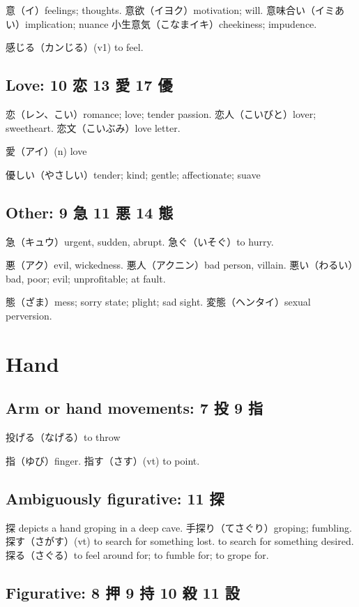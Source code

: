 意（イ）feelings; thoughts.
意欲（イヨク）motivation; will.
意味合い（イミあい）implication; nuance
小生意気（こなまイキ）cheekiness; impudence.

感じる（カンじる）(v1) to feel.

\subsection{Love: 10 恋 13 愛 17 優}

恋（レン、こい）romance; love; tender passion.
恋人（こいびと）lover; sweetheart.
恋文（こいぶみ）love letter.

愛（アイ）(n) love

優しい（やさしい）tender; kind; gentle; affectionate; suave

\subsection{Other: 9 急 11 悪 14 態}

急（キュウ）urgent, sudden, abrupt.
急ぐ（いそぐ）to hurry.

悪（アク）evil, wickedness.
悪人（アクニン）bad person, villain.
悪い（わるい）bad, poor; evil; unprofitable; at fault.

態（ざま）mess; sorry state; plight; sad sight.
変態（ヘンタイ）sexual perversion.

\section{Hand}

\subsection{Arm or hand movements: 7 投 9 指}

投げる（なげる）to throw

指（ゆび）finger.
指す（さす）(vt) to point.

\subsection{Ambiguously figurative: 11 探}

探 depicts a hand groping in a deep cave.
手探り（てさぐり）groping; fumbling.
探す（さがす）(vt)
to search for something lost.
to search for something desired.
探る（さぐる）to feel around for; to fumble for; to grope for.

\subsection{Figurative: 8 押 9 持 10 殺 11 設}

